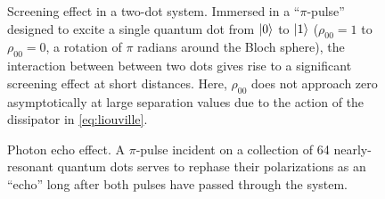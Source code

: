 \documentclass[conference]{IEEEtran}
\begin{document}
\begin{figure}
  \centering
  
  \caption{\label{fig:screening} Screening effect in a two-dot system.
  Immersed in a ``$\pi$-pulse'' designed to excite a single quantum dot from $\ket{0}$ to $\ket{1}$ ($\rho_{00} = 1$ to $\rho_{00} = 0$, a rotation of $\pi$ radians around the Bloch sphere), the interaction between between two dots gives rise to a significant screening effect at short distances.
  Here, $\rho_{00}$ does not approach zero asymptotically at large separation values due to the action of the dissipator in \cref{eq:liouville}.
  }
\end{figure}

\begin{figure}
  \centering
  
  \caption{\label{fig:echo} Photon echo effect. 
    A $\pi$-pulse incident on a collection of 64 nearly-resonant quantum dots serves to rephase their polarizations as an ``echo'' long after both pulses have passed through the system.
  }
\end{figure}
\end{document}
